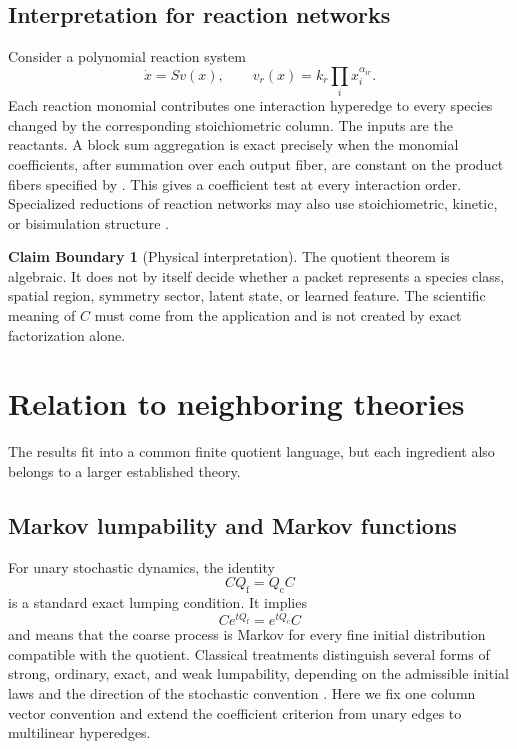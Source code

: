 \documentclass[11pt]{article}
\theoremstyle{definition}
\newtheorem{boundary}[theorem]{Claim Boundary}
\theoremstyle{remark}
\newcommand{\fine}{\mathrm f}
\newcommand{\coarse}{\mathrm c}
\begin{document}
\subsection{Interpretation for reaction networks}
Consider a polynomial reaction system
\[
  \dot x=S v(x),
  \qquad
  v_r(x)=k_r\prod_i x_i^{\alpha_{ir}}.
\]
Each reaction monomial contributes one interaction hyperedge to every species changed by the corresponding stoichiometric column.  The inputs are the reactants.  A block sum aggregation is exact precisely when the monomial coefficients, after summation over each output fiber, are constant on the product fibers specified by .  This gives a coefficient test at every interaction order.  Specialized reductions of reaction networks may also use stoichiometric, kinetic, or bisimulation structure \cite{Cardelli2015,Cardelli2017,BaezPollard2017}.

\begin{boundary}[Physical interpretation]
The quotient theorem is algebraic.  It does not by itself decide whether a packet represents a species class, spatial region, symmetry sector, latent state, or learned feature.  The scientific meaning of $C$ must come from the application and is not created by exact factorization alone.
\end{boundary}

\section{Relation to neighboring theories}\label{sec:relations}

The results fit into a common finite quotient language, but each ingredient also belongs to a larger established theory.

\subsection{Markov lumpability and Markov functions}
For unary stochastic dynamics, the identity
\[
  CQ_{\fine}=Q_{\coarse}C
\]
is a standard exact lumping condition.  It implies
\[
  Ce^{tQ_{\fine}}=e^{tQ_{\coarse}}C
\]
and means that the coarse process is Markov for every fine initial distribution compatible with the quotient.  Classical treatments distinguish several forms of strong, ordinary, exact, and weak lumpability, depending on the admissible initial laws and the direction of the stochastic convention \cite{KemenySnell1960,RogersPitman1981,Buchholz1994}.  Here we fix one column vector convention and extend the coefficient criterion from unary edges to multilinear hyperedges.
\end{document}
